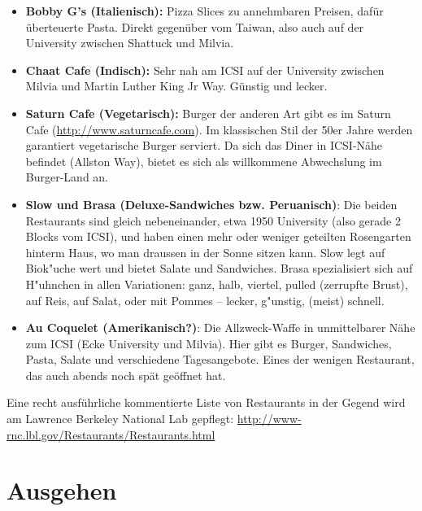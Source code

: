 \documentclass[a4paper]{scrreprt}
\begin{document}
\begin{itemize}
	\item \textbf{Bobby G's  (Italienisch):} Pizza Slices zu annehmbaren Preisen, dafür überteuerte Pasta. Direkt gegenüber vom Taiwan, also auch auf der University zwischen Shattuck und Milvia.
  
  \item \textbf{Chaat Cafe (Indisch):} Sehr nah am ICSI auf der University zwischen Milvia und Martin Luther King Jr Way. Günstig und lecker.   
  
  \item \textbf{Saturn Cafe (Vegetarisch):} Burger der anderen Art gibt es im Saturn Cafe (\url{http://www.saturncafe.com}). Im klassischen Stil der 50er Jahre werden garantiert vegetarische Burger serviert. Da sich das Diner in ICSI-Nähe befindet (Allston Way), bietet es sich als willkommene Abwechslung im Burger-Land an.
  
  \item \textbf{Slow und Brasa (Deluxe-Sandwiches bzw. Peruanisch)}: Die beiden Restaurants sind gleich nebeneinander, etwa 1950 University (also gerade 2 Blocks vom ICSI), und haben einen mehr oder weniger geteilten Rosengarten hinterm Haus, wo man draussen in der Sonne sitzen kann. Slow legt auf Biok"uche wert und bietet Salate und Sandwiches. Brasa spezialisiert sich auf H"uhnchen in allen Variationen: ganz, halb, viertel, pulled (zerrupfte Brust), auf Reis, auf Salat, oder mit Pommes -- lecker, g"unstig, (meist) schnell.
  
  	\item \textbf{Au Coquelet (Amerikanisch?)}: Die Allzweck-Waffe in unmittelbarer Nähe zum ICSI (Ecke University und Milvia). Hier gibt es Burger, Sandwiches, Pasta, Salate und verschiedene Tagesangebote. Eines der wenigen Restaurant, das auch abends noch spät geöffnet hat.

\end{itemize}

Eine recht ausführliche kommentierte Liste von Restaurants in der Gegend wird am Lawrence Berkeley National Lab gepflegt: \url{http://www-rnc.lbl.gov/Restaurants/Restaurants.html} 

\section{Ausgehen}
\end{document}
